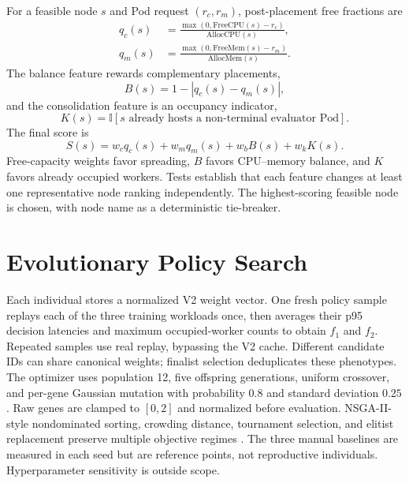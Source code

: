 \documentclass[conference]{IEEEtran}
\begin{document}
For a feasible node $s$ and Pod request $(r_c,r_m)$, post-placement free fractions are
\begin{equation}
\begin{aligned}
q_c(s)&=\frac{\max(0,\mathrm{FreeCPU}(s)-r_c)}{\mathrm{AllocCPU}(s)},\\
q_m(s)&=\frac{\max(0,\mathrm{FreeMem}(s)-r_m)}{\mathrm{AllocMem}(s)}.
\end{aligned}
\end{equation}
The balance feature rewards complementary placements,
\begin{equation}
 B(s)=1-|q_c(s)-q_m(s)|,
\end{equation}
and the consolidation feature is an occupancy indicator,
\begin{equation}
 K(s)=\mathbb{I}[\text{$s$ already hosts a non-terminal evaluator Pod}].
\end{equation}
The final score is
\begin{equation}
S(s)=w_cq_c(s)+w_mq_m(s)+w_bB(s)+w_kK(s).
\end{equation}
Free-capacity weights favor spreading, $B$ favors CPU--memory balance, and $K$ favors already occupied workers. Tests establish that each feature changes at least one representative node ranking independently. The highest-scoring feasible node is chosen, with node name as a deterministic tie-breaker.

\section{Evolutionary Policy Search}
Each individual stores a normalized V2 weight vector. One fresh policy sample replays each of the three training workloads once, then averages their p95 decision latencies and maximum occupied-worker counts to obtain $f_1$ and $f_2$. Repeated samples use real replay, bypassing the V2 cache. Different candidate IDs can share canonical weights; finalist selection deduplicates these phenotypes.
The optimizer uses population 12, five offspring generations, uniform crossover, and per-gene Gaussian mutation with probability $0.8$ and standard deviation $0.25$. Raw genes are clamped to $[0,2]$ and normalized before evaluation. NSGA-II-style nondominated sorting, crowding distance, tournament selection, and elitist replacement preserve multiple objective regimes \cite{ref-nsga2}. The three manual baselines are measured in each seed but are reference points, not reproductive individuals. Hyperparameter sensitivity is outside scope.
\end{document}
